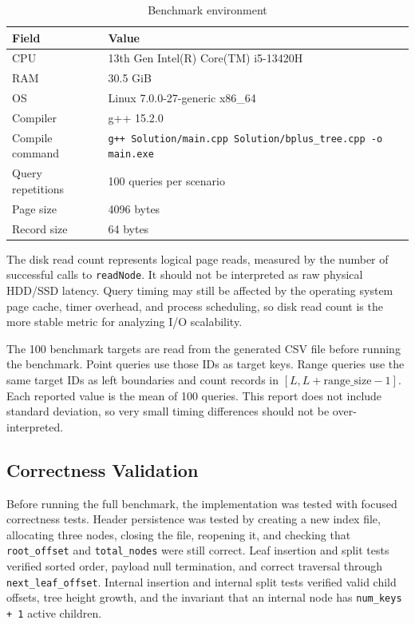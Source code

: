 \documentclass[12pt,a4paper]{article}
\begin{document}
\begin{table}[H]
\centering
\caption{Benchmark environment}
\begin{tabular}{l l}
\toprule
\textbf{Field} & \textbf{Value} \\
\midrule
CPU & 13th Gen Intel(R) Core(TM) i5-13420H \\
RAM & 30.5 GiB \\
OS & Linux 7.0.0-27-generic x86\_64 \\
Compiler & g++ 15.2.0 \\
Compile command & \texttt{g++ Solution/main.cpp Solution/bplus\_tree.cpp -o main.exe} \\
Query repetitions & 100 queries per scenario \\
Page size & 4096 bytes \\
Record size & 64 bytes \\
\bottomrule
\end{tabular}
\end{table}

The disk read count represents logical page reads, measured by the number of successful calls to \texttt{readNode}. It should not be interpreted as raw physical HDD/SSD latency. Query timing may still be affected by the operating system page cache, timer overhead, and process scheduling, so disk read count is the more stable metric for analyzing I/O scalability.

The 100 benchmark targets are read from the generated CSV file before running the benchmark. Point queries use those IDs as target keys. Range queries use the same target IDs as left boundaries and count records in $[L, L + \text{range\_size} - 1]$. Each reported value is the mean of 100 queries. This report does not include standard deviation, so very small timing differences should not be over-interpreted.

\subsection{Correctness Validation}

Before running the full benchmark, the implementation was tested with focused correctness tests. Header persistence was tested by creating a new index file, allocating three nodes, closing the file, reopening it, and checking that \texttt{root\_offset} and \texttt{total\_nodes} were still correct. Leaf insertion and split tests verified sorted order, payload null termination, and correct traversal through \texttt{next\_leaf\_offset}. Internal insertion and internal split tests verified valid child offsets, tree height growth, and the invariant that an internal node has \texttt{num\_keys + 1} active children.
\end{document}

